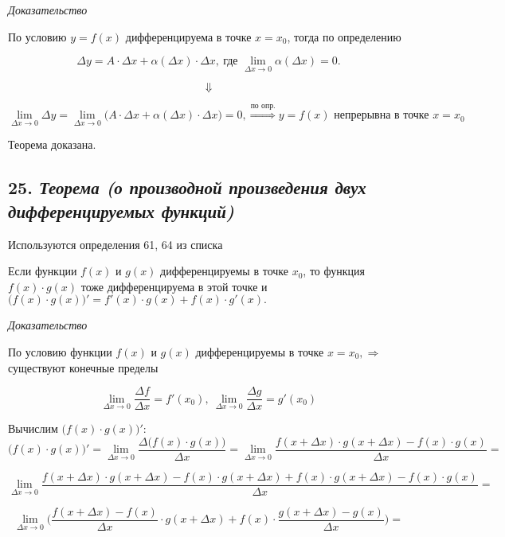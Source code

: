 \textit{Доказательство}

По условию $y = f(x)$ дифференцируема в точке $x = x_0$, тогда по определению

$$
\Delta y = A \cdot \Delta x + \alpha(\Delta x)\cdot \Delta x, \ \text{где } \lim\limits_{\Delta x \rightarrow 0}\alpha(\Delta x) = 0. 
$$

$$\Downarrow $$

$$
\lim\limits_{\Delta x \rightarrow 0}\Delta y = \lim\limits_{\Delta x \rightarrow 0}\big(A \cdot \Delta x + \alpha(\Delta x)\cdot \Delta x \big) = 0, \overset{\text{по опр.}}{\Rightarrow} y = f(x) \text{ непрерывна в точке } x = x_0
$$

Теорема доказана.
\newpage 
\subsection*{25. \textit{Теорема (о производной произведения двух дифференцируемых функций)}}
\begin{Quote2} 
\small\centering 

Используются определения 61, 64 из списка \end{Quote2} 

Если функции $f(x)$ и $g(x)$ дифференцируемы в точке $x_0$, то функция $f(x)\cdot g(x)$ тоже дифференцируема в этой точке и $\big(f(x)\cdot g(x)\big)' = f'(x)\cdot g(x) + f(x)\cdot g'(x).$
\vspace*{20pt} 

\textit{Доказательство}

По условию функции $f(x)$ и $g(x)$ дифференцируемы в точке $x = x_0, \Rightarrow$ существуют конечные пределы

$$
\lim\limits_{\Delta x \rightarrow 0}\dfrac{\Delta f}{\Delta x} = f'(x_0), \ \lim\limits_{\Delta x \rightarrow 0}\dfrac{\Delta g}{\Delta x} = g'(x_0)
$$

Вычислим $\big(f(x)\cdot g(x)\big)':$ $$
\big(f(x)\cdot g(x)\big)' 
= \lim\limits_{\Delta x \rightarrow 0}{\dfrac{\Delta \big(f(x)\cdot g(x)\big)}{\Delta x}} 
= \lim\limits_{\Delta x \rightarrow 0}{\dfrac{f(x + \Delta x)\cdot g(x + \Delta x) - f(x)\cdot g(x)}{\Delta x}} 
= 
$$

$$
\lim\limits_{\Delta x \rightarrow 0}{\dfrac{f(x + \Delta x)\cdot g(x + \Delta x) - f(x)\cdot g(x + \Delta x) + f(x)\cdot g(x + \Delta x) - f(x)\cdot g(x)}{\Delta x}} 
=
$$

$$
\lim\limits_{\Delta x \rightarrow 0}\bigg(\dfrac{f(x + \Delta x)- f(x)}{\Delta x}\cdot g(x + \Delta x) + f(x)\cdot \dfrac{g(x + \Delta x)- g(x)}{\Delta x}\bigg) 
=
$$

